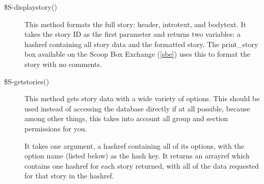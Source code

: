 \begin{description}
\item[\$S-\latexhtml{$>$}{>}displaystory()] This method formats the full story: header, introtext, and bodytext. It takes the story ID as the first parameter and returns two variables: a hashref containing all story data and the formatted story. The print\_story box available on the Scoop Box Exchange (\ref{sbe}) uses this to format the story with no comments.

\item[\$S-\latexhtml{$>$}{>}getstories()] This method gets story data with a wide variety of options. This should be used instead of accessing the database directly if at all possible, because among other things, this takes into account all group and section permissions for you.

It takes one argument, a hashref containing all of its options, with the option name (listed below) as the hash key. It returns an arrayref which contains one hashref for each story returned, with all of the data requested for that story in the hashref.


\end{description}
